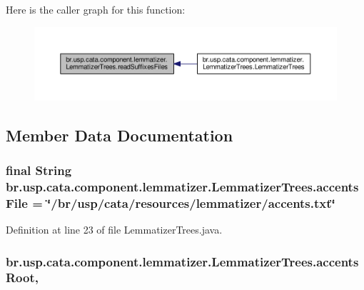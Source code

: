 Here is the caller graph for this function\+:\nopagebreak
\begin{figure}[H]
\begin{center}
\leavevmode
\includegraphics[width=350pt]{classbr_1_1usp_1_1cata_1_1component_1_1lemmatizer_1_1_lemmatizer_trees_a736c56ee1e984ca2f1eeafea2b6d8299_icgraph}
\end{center}
\end{figure}




\subsection{Member Data Documentation}
\hypertarget{classbr_1_1usp_1_1cata_1_1component_1_1lemmatizer_1_1_lemmatizer_trees_ac447265bf3916189bd063ed9b9738cd3}{
\subsubsection[{accents\+File}]{\setlength{\rightskip}{0pt plus 5cm}final String br.\+usp.\+cata.\+component.\+lemmatizer.\+Lemmatizer\+Trees.\+accents\+File = \char`\"{}/br/usp/cata/resources/lemmatizer/accents.\+txt\char`\"{}\hspace{0.3cm}{\ttfamily [private]}}}\label{classbr_1_1usp_1_1cata_1_1component_1_1lemmatizer_1_1_lemmatizer_trees_ac447265bf3916189bd063ed9b9738cd3}


Definition at line 23 of file Lemmatizer\+Trees.\+java.

\hypertarget{classbr_1_1usp_1_1cata_1_1component_1_1lemmatizer_1_1_lemmatizer_trees_a3ff64828b81013c9f3ea1744e2ed996f}{
\subsubsection[{accents\+Root}]{ br.\+usp.\+cata.\+component.\+lemmatizer.\+Lemmatizer\+Trees.\+accents\+Root\hspace{0.3cm}{\ttfamily [static]}, {\ttfamily [private]}}}\label{classbr_1_1usp_1_1cata_1_1component_1_1lemmatizer_1_1_lemmatizer_trees_a3ff64828b81013c9f3ea1744e2ed996f}


